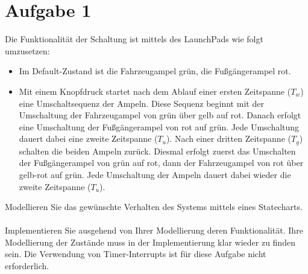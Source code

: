 \section{Aufgabe 1}
Die Funktionalität der Schaltung ist mittels des LaunchPads wie folgt umzusetzen:
\begin{itemize}
	\item Im Default-Zustand ist die Fahrzeugampel grün, die Fu\ss{}gängerampel rot. 
	\item Mit einem Knopfdruck startet nach dem Ablauf einer ersten Zeitspanne ($T_w$) eine Umschaltsequenz der Ampeln. Diese Sequenz beginnt mit der Umschaltung der Fahrzeugampel von grün über gelb auf rot. Danach erfolgt eine Umschaltung der Fu\ss{}gängerampel von rot auf grün. Jede Umschaltung dauert dabei eine zweite Zeitspanne ($T_u$). Nach einer dritten Zeitspanne ($T_g$) schalten die beiden Ampeln zurück. Diesmal erfolgt zuerst das Umschalten der Fu\ss{}gängerampel von grün auf rot, dann der Fahrzeugampel von rot über gelb-rot auf grün. Jede Umschaltung der Ampeln dauert dabei wieder die zweite Zeitspanne ($T_u$).
\end{itemize}
Modellieren Sie das gewünschte Verhalten des Systems mittels eines Statecharts.\\ \\
Implementieren Sie ausgehend von Ihrer Modellierung deren Funktionalität. Ihre Modellierung der Zustände muss in der Implementierung klar wieder zu finden sein. Die Verwendung von Timer-Interrupts ist für diese Aufgabe nicht erforderlich.
